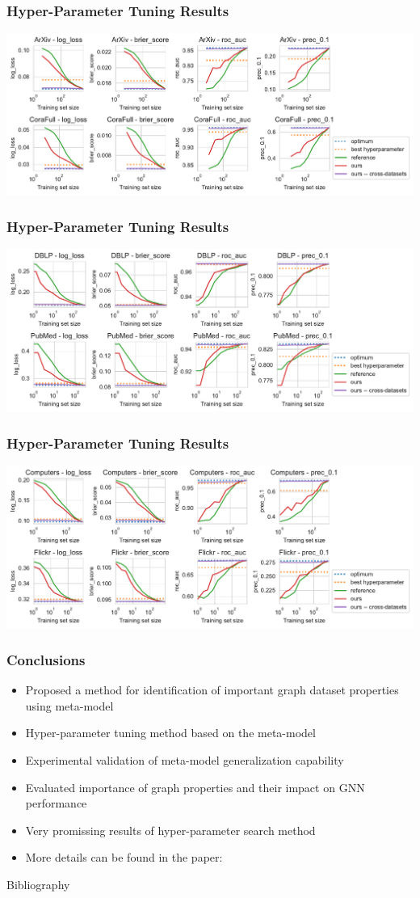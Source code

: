 \documentclass[10pt, 169]{beamer}
\begin{document}
\begin{frame}
	\frametitle{Hyper-Parameter Tuning Results}
	\scalebox{1} {\includegraphics[width=0.9\linewidth]{images/hyperpar_tuning_small1.pdf}}
\end{frame}

\begin{frame}
	\frametitle{Hyper-Parameter Tuning Results}
	\scalebox{1} {\includegraphics[width=0.9\linewidth]{images/hyperpar_tuning_small2.pdf}}
\end{frame}

\begin{frame}
	\frametitle{Hyper-Parameter Tuning Results}
	\scalebox{1} {\includegraphics[width=0.9\linewidth]{images/hyperpar_tuning_small3.pdf}}
\end{frame}

\begin{frame}
	\frametitle{Conclusions}
	\begin{itemize}
		\item Proposed a method for identification of important graph
dataset properties using meta-model
		\item Hyper-parameter tuning method
based on the meta-model
		\item Experimental validation of meta-model generalization capability
		\item Evaluated importance of graph properties and their impact on GNN performance
		\item Very promissing results of hyper-parameter search method
		\item More details can be found in the paper: \cite{prochazka_which_2023}
	\end{itemize}
\end{frame}

\begin{frame}{Bibliography}
	\printbibliography
\end{frame}

\begin{frame}
	\titlepage
\end{frame}
\end{document}
